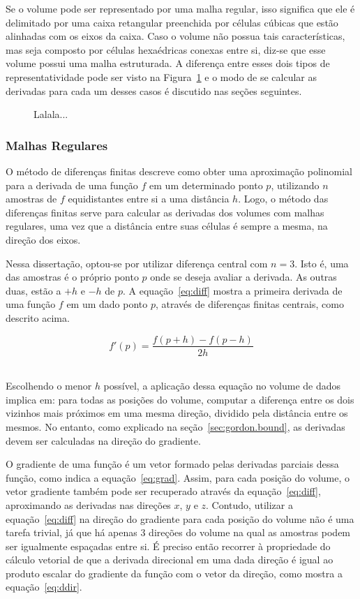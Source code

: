 	Se o volume pode ser representado por uma malha regular, isso significa que ele é delimitado por uma caixa retangular preenchida por células cúbicas que estão alinhadas com os eixos da caixa. Caso o volume não possua tais características, mas seja composto por células hexaédricas conexas entre si, diz-se que esse volume possui uma malha estruturada. A diferença entre esses dois tipos de representatividade pode ser visto na Figura~\ref{fig:meshes} e o modo de se calcular as derivadas para cada um desses casos é discutido nas seções seguintes.
	
\begin{figure}[h]
	\centering
	\label{fig:meshes}
	\caption{Lalala...}
\end{figure}
    
\subsubsection{Malhas Regulares}
\label{subsec:my.struct}
	O método de diferenças finitas descreve como obter uma aproximação polinomial para a derivada de uma função $ f $ em um determinado ponto $ p $, utilizando $ n $ amostras de $ f $ equidistantes entre si a uma distância $ h $. Logo, o método das diferenças finitas serve para calcular as derivadas dos volumes com malhas regulares, uma vez que a distância entre suas células é sempre a mesma, na direção dos eixos.
	
	Nessa dissertação, optou-se por utilizar diferença central com $ n = 3 $. Isto é, uma das amostras é o próprio ponto $ p $ onde se deseja avaliar a derivada. As outras duas, estão a $ +h $ e $ -h $ de $ p $. A equação~\eqref{eq:diff} mostra a primeira derivada de uma função $ f $ em um dado ponto $ p $, através de diferenças finitas centrais, como descrito acima.
	
\begin{equation}\label{eq:diff}
	f'(p) = \frac{f(p + h) - f(p - h)}{2h}
\end{equation} \

	Escolhendo o menor $ h $ possível, a aplicação dessa equação no volume de dados implica em: para todas as posições do volume, computar a diferença entre os dois vizinhos mais próximos em uma mesma direção, dividido pela distância entre os mesmos. No entanto, como explicado na seção~\ref{sec:gordon.bound}, as derivadas devem ser calculadas na direção do gradiente.
	
	O gradiente de uma função é um vetor formado pelas derivadas parciais dessa função, como indica a equação~\eqref{eq:grad}. Assim, para cada posição do volume, o vetor gradiente também pode ser recuperado através da equação~\eqref{eq:diff}, aproximando as derivadas nas direções $ x $, $ y $ e $ z $. Contudo, utilizar a equação~\eqref{eq:diff} na direção do gradiente para cada posição do volume não é uma tarefa trivial, já que há apenas 3 direções do volume na qual as amostras podem ser igualmente espaçadas entre si. É preciso então recorrer à propriedade do cálculo vetorial de que a derivada direcional em uma dada direção é igual ao produto escalar do gradiente da função com o vetor da direção, como mostra a equação~\eqref{eq:ddir}.
	
